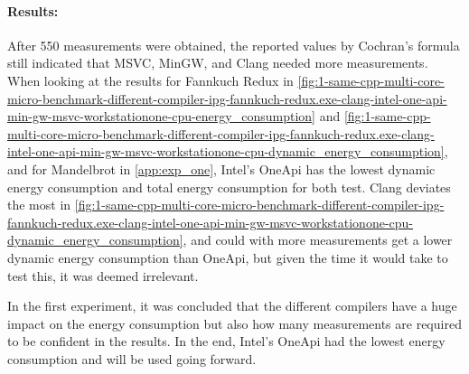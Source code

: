 


\paragraph{Results:} After 550 measurements were obtained, the reported values by Cochran's formula still indicated that MSVC, MinGW, and Clang needed more measurements. When looking at the results for Fannkuch Redux in \cref{fig:1-same-cpp-multi-core-micro-benchmark-different-compiler-ipg-fannkuch-redux.exe-clang-intel-one-api-min-gw-msvc-workstationone-cpu-energy_consumption} and \cref{fig:1-same-cpp-multi-core-micro-benchmark-different-compiler-ipg-fannkuch-redux.exe-clang-intel-one-api-min-gw-msvc-workstationone-cpu-dynamic_energy_consumption}, and for Mandelbrot in \cref{app:exp_one}, Intel's OneApi has the lowest dynamic energy consumption and total energy consumption for both test. Clang deviates the most in \cref{fig:1-same-cpp-multi-core-micro-benchmark-different-compiler-ipg-fannkuch-redux.exe-clang-intel-one-api-min-gw-msvc-workstationone-cpu-dynamic_energy_consumption}, and could with more measurements get a lower dynamic energy consumption than OneApi, but given the time it would take to test this, it was deemed irrelevant.

In the first experiment, it was concluded that the different compilers have a huge impact on the energy consumption but also how many measurements are required to be confident in the results. In the end, Intel's OneApi had the lowest energy consumption and will be used going forward.


